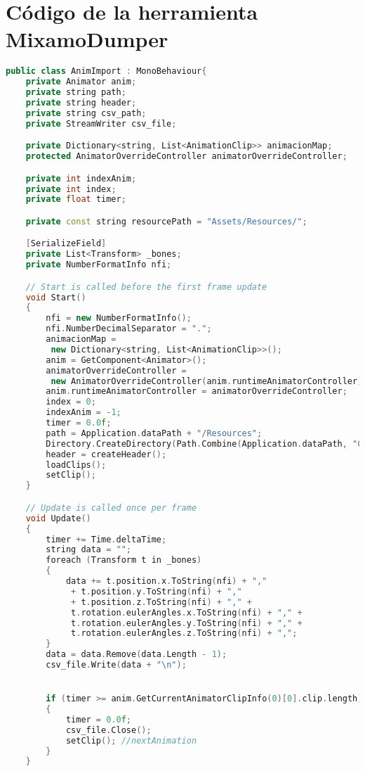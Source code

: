 \chapter{Código de la herramienta MixamoDumper}
\label{appendix:MixamoDumperCode}

\begin{lstlisting}[language=C++]
public class AnimImport : MonoBehaviour{
    private Animator anim;
    private string path;
    private string header;
    private string csv_path;
    private StreamWriter csv_file;

    private Dictionary<string, List<AnimationClip>> animacionMap;
    protected AnimatorOverrideController animatorOverrideController;

    private int indexAnim;
    private int index;
    private float timer;

    private const string resourcePath = "Assets/Resources/";

    [SerializeField]
    private List<Transform> _bones;
    private NumberFormatInfo nfi;

    // Start is called before the first frame update
    void Start()
    {
        nfi = new NumberFormatInfo();
        nfi.NumberDecimalSeparator = ".";
        animacionMap = 
         new Dictionary<string, List<AnimationClip>>();
        anim = GetComponent<Animator>();
        animatorOverrideController =
         new AnimatorOverrideController(anim.runtimeAnimatorController);
        anim.runtimeAnimatorController = animatorOverrideController;
        index = 0;
        indexAnim = -1;
        timer = 0.0f;
        path = Application.dataPath + "/Resources";
        Directory.CreateDirectory(Path.Combine(Application.dataPath, "CSV"));
        header = createHeader();
        loadClips();
        setClip();
    }

    // Update is called once per frame
    void Update()
    {
        timer += Time.deltaTime;
        string data = "";
        foreach (Transform t in _bones)
        {
            data += t.position.x.ToString(nfi) + ","
             + t.position.y.ToString(nfi) + "," 
             + t.position.z.ToString(nfi) + "," + 
             t.rotation.eulerAngles.x.ToString(nfi) + "," + 
             t.rotation.eulerAngles.y.ToString(nfi) + "," + 
             t.rotation.eulerAngles.z.ToString(nfi) + ",";
        }
        data = data.Remove(data.Length - 1);
        csv_file.Write(data + "\n");


        if (timer >= anim.GetCurrentAnimatorClipInfo(0)[0].clip.length)
        {
            timer = 0.0f;
            csv_file.Close();
            setClip(); //nextAnimation
        }
    }


\end{lstlisting}
